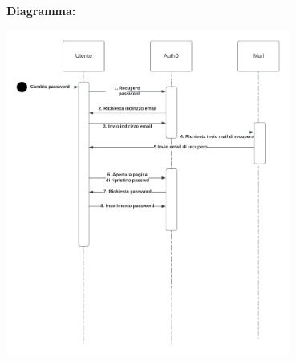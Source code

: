 \begin{listaPersonale}[UC]{}
    \textbf{Diagramma:}
    \begin{center}
        \includegraphics[width=0.7\textwidth]{img/Diagrammi/DS/DS_RecuperoPassword.png}
    \end{center}

\end{listaPersonale}
